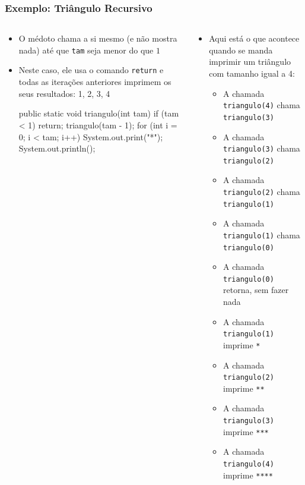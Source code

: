 \documentclass[xcolor={dvipsnames,table},aspectratio=169]{beamer}
\begin{document}
\begin{frame}[fragile]\frametitle{Exemplo: Triângulo Recursivo}
\begin{columns}[T]
	\begin{column}{0.5\linewidth}
\begin{itemize}
    \scriptsize
	\item O médoto chama a si mesmo (e não mostra nada) até que \texttt{tam} seja menor do que $1$
	\item Neste caso, ele usa o comando \texttt{return} e todas as iterações anteriores imprimem os seus resultados: 1, 2, 3, 4
\begin{javacode}
public static void triangulo(int tam) {
  if (tam < 1)
     return;
  triangulo(tam - 1);
  for (int i = 0; i < tam; i++)
    System.out.print("*");
  System.out.println();
}
\end{javacode}
\end{itemize}
	\end{column}
	\begin{column}{0.5\linewidth}
{\scriptsize
\begin{itemize}
    \scriptsize
    \item Aqui está o que acontece quando se manda imprimir um triângulo com tamanho igual a 4:
    \begin{itemize}
    \scriptsize
	\item A chamada \texttt{triangulo(4)} chama \texttt{triangulo(3)}
	\item A chamada \texttt{triangulo(3)} chama \texttt{triangulo(2)}
	\item A chamada \texttt{triangulo(2)} chama \texttt{triangulo(1)}
	\item A chamada \texttt{triangulo(1)} chama \texttt{triangulo(0)}
	\item A chamada \texttt{triangulo(0)} retorna, sem fazer nada
	\item A chamada \texttt{triangulo(1)} imprime \texttt{*}
	\item A chamada \texttt{triangulo(2)} imprime \texttt{**}
	\item A chamada \texttt{triangulo(3)} imprime \texttt{***}
	\item A chamada \texttt{triangulo(4)} imprime \texttt{****}
    \end{itemize}
\end{itemize}
}
	\end{column}
\end{columns}
\end{frame}
\end{document}
